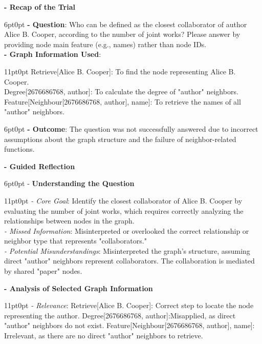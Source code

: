 \documentclass[11pt]{article}
\begin{document}
\begin{tcolorbox}[colback=white!10!white, colframe=blue!30!black, title=Reflection Process, boxrule=1pt, fontupper={\fontsize{7pt}{9pt}\selectfont}]
\justifying
\noindent
\textbf{- Recap of the Trial}
\begin{adjustwidth}{6pt}{0pt}
 \textbf{- Question}: Who can be defined as the closest collaborator of author Alice B. Cooper, according to the number of  joint works? Please answer by providing node main feature (e.g., names) rather than node IDs.\\
 \textbf{- Graph Information Used}:
\end{adjustwidth}
\begin{adjustwidth}{11pt}{0pt}
    Retrieve[Alice B. Cooper]: To find the node representing Alice B. Cooper.\\
    Degree[2676686768, author]: To calculate the degree of "author" neighbors.\\
    Feature[Neighbour[2676686768, author], name]: To retrieve the names of all "author" neighbors.
\end{adjustwidth}
\begin{adjustwidth}{6pt}{0pt}
\textbf{- Outcome}: The question was not successfully answered due to incorrect assumptions about the graph structure and the failure of neighbor-related functions.
\end{adjustwidth}
\textbf{- Guided Reflection}
\begin{adjustwidth}{6pt}{0pt}
 - \textbf{Understanding the Question}
\end{adjustwidth}
\begin{adjustwidth}{11pt}{0pt}
   \textit{- Core Goal}: Identify the closest collaborator of Alice B. Cooper by evaluating the number of joint works, which requires correctly analyzing the relationships between nodes in the graph.\\
   \textit{- Missed Information}: Misinterpreted or overlooked the correct relationship or neighbor type that represents "collaborators."\\
   \textit{- Potential Misunderstandings}: Misinterpreted the graph's structure, assuming direct "author" neighbors represent collaborators. The collaboration is mediated by shared "paper" nodes.
\end{adjustwidth}
\textbf{- Analysis of Selected Graph Information}
\begin{adjustwidth}{11pt}{0pt}
 \textit{- Relevance}: Retrieve[Alice B. Cooper]: Correct step to locate the node representing the author. Degree[2676686768, author]:Misapplied, as direct "author" neighbors do not exist. Feature[Neighbour[2676686768, author], name]: Irrelevant, as there are no direct "author" neighbors to retrieve.\\

\end{adjustwidth}
\end{tcolorbox}
\end{document}
